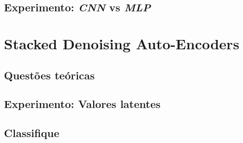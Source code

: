 \documentclass[12pt, a4paper]{article}
\begin{document}
\subsection{Experimento: \emph{CNN} vs \emph{MLP}}

\section{Stacked Denoising Auto-Encoders}
\subsection{Questões teóricas}
\subsection{Experimento: Valores latentes}
\subsection{Classifique}
\end{document}
